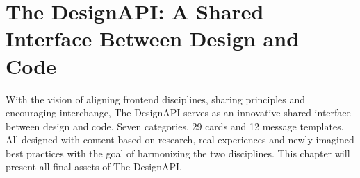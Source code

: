 \newpage
\section{The DesignAPI: A Shared Interface Between Design and Code}
With the vision of aligning frontend disciplines, sharing principles and encouraging interchange,
The DesignAPI serves as an innovative shared interface between design and code. Seven categories, 29
cards and 12 message templates. All designed with content based on research, real experiences and
newly imagined best practices with the goal of harmonizing the two disciplines. This chapter will
present all final assets of The DesignAPI.






